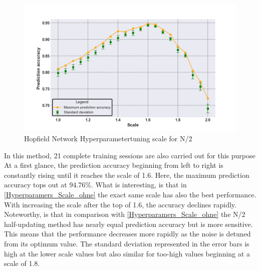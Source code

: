 \begin{figure}[H]
    \centering
    \includegraphics[width=0.8\linewidth]{graphics/NEW_Scale_MIT_N2_Half_Pred_Acc.png}
    \caption{Hopfield Network Hyperparametertuning scale for N/2}
    \label{Hyperparamers_Scale_mit}
\end{figure}
In this method, 21 complete training sessions are also carried out for this purpose
At a first glance, the prediction accuracy beginning from left to right is constantly rising until it reaches the scale of 1.6.
Here, the maximum prediction accuracy tops out at 94.76\%.
What is interesting, is that in \ref{Hyperparamers_Scale_ohne} the exact same scale has also the best performance. 
With increasing the scale after the top of 1.6, the accuracy declines rapidly. 
Noteworthy, is that in comparison with \ref{Hyperparamers_Scale_ohne} the N/2 half-updating method has nearly equal prediction accuracy
but is more sensitive. 
This means that the performance decreases more rapidly as the noise is detuned from its optimum value. 
The standard deviation represented in the error bars is high at the lower scale values but also similar for too-high values beginning at a scale of 1.8.


